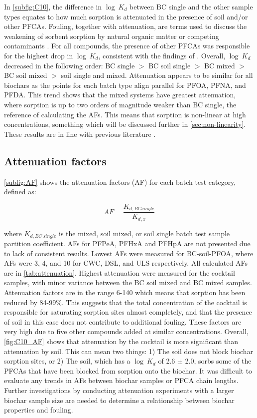 In \cref{subfig:C10}, the difference in $\log~K_d$ between BC single and the other sample types equates to how much sorption is attenuated in the presence of soil and/or other PFCAs. Fouling, together with attenuation, are terms used to discuss the weakening of sorbent sorption by natural organic matter or competing contaminants \citep{Werner2006}. For all compounds, the presence of other PFCAs was responsible for the highest drop in $\log~K_d$, consistent with the findings of \cite{Cornelissen2006}. Overall, $\log~K_d$ decreased in the following order: BC single $>$ BC soil single $>$ BC mixed $>$ BC soil mixed $>$ soil single and mixed. Attenuation appears to be similar for all biochars as the points for each batch type align parallel for PFOA, PFNA, and PFDA. This trend shows that the mixed systems have greatest attenuation, where sorption is up to two orders of magnitude weaker than BC single, the reference of calculating the AFs. This means that sorption is non-linear at high concentrations, something which will be discussed further in \cref{sec:non-linearity}. These results are in line with previous literature \citep{deng2010removal, zhou2010sorption}.

\subsection{Attenuation factors}
\cref{subfig:AF} shows the attenuation factors (\acrshort{AF}) for each batch test category, defined as:

\begin{equation} \label{eq:AF}
    AF = \frac{K_{d,BC single}}{K_{d,x}}
\end{equation}

where $K_{d,BC~single}$ is the mixed, soil mixed, or soil single batch test sample partition coefficient. AFs for PFPeA, PFHxA and PFHpA are not presented due to lack of consistent results. Lowest AFs were measured for BC-soil-PFOA, where AFs were 3, 4, and 10 for CWC, DSL, and ULS respectively. All calculated AFs are in \cref{tab:attenuation}. Highest attenuation were measured for the cocktail samples, with minor variance between the BC soil mixed and BC mixed samples. Attenuation factors are in the range 6-140 which means that sorption has been reduced by 84-99\%. This suggests that the total concentration of the cocktail is responsible for saturating sorption sites almost completely, and that the presence of soil in this case does not contribute to additional fouling. These factors are very high due to five other compounds added at similar concentrations. Overall, \cref{fig:C10_AF} shows that attenuation by the cocktail is more significant than attenuation by soil. This can mean two things: 1) The soil does not block biochar sorption sites, or 2) The soil, which has a $\log~K_d$ of 2.6 $\pm$ 2.0, sorbs some of the PFCAs that have been blocked from sorption onto the biochar. It was difficult to evaluate any trends in AFs between biochar samples or PFCA chain lengths. Further investigations by conducting attenuation experiments with a larger biochar sample size are needed to determine a relationship between biochar properties and fouling. 


